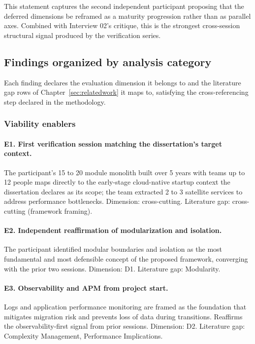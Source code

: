 This statement captures the second independent participant proposing that the deferred dimensions be reframed as a maturity progression rather than as parallel axes. Combined with Interview 02's critique, this is the strongest cross-session structural signal produced by the verification series.

\subsection*{Findings organized by analysis category}

Each finding declares the evaluation dimension it belongs to and the literature gap rows of Chapter~\ref{sec:relatedwork} it maps to, satisfying the cross-referencing step declared in the methodology.

\subsubsection*{Viability enablers}

\paragraph*{E1. First verification session matching the dissertation's target context.} The participant's 15 to 20 module monolith built over 5 years with teams up to 12 people maps directly to the early-stage cloud-native startup context the dissertation declares as its scope; the team extracted 2 to 3 satellite services to address performance bottlenecks. Dimension: cross-cutting. Literature gap: cross-cutting (framework framing).

\paragraph*{E2. Independent reaffirmation of modularization and isolation.} The participant identified modular boundaries and isolation as the most fundamental and most defensible concept of the proposed framework, converging with the prior two sessions. Dimension: D1. Literature gap: Modularity.

\paragraph*{E3. Observability and APM from project start.} Logs and application performance monitoring are framed as the foundation that mitigates migration risk and prevents loss of data during transitions. Reaffirms the observability-first signal from prior sessions. Dimension: D2. Literature gap: Complexity Management, Performance Implications.


